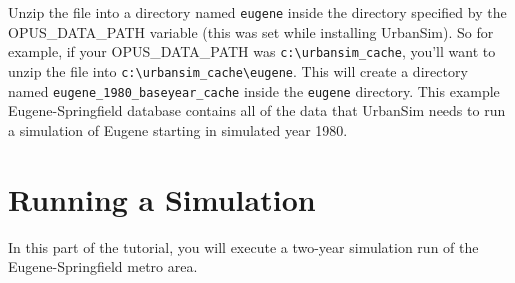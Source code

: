 \documentclass{howto}
\begin{document}

Unzip the file into a directory named \verb|eugene| inside the directory specified by the
OPUS_DATA_PATH variable (this was set while installing UrbanSim).  So for 
example, if your OPUS_DATA_PATH was \verb|c:\urbansim_cache|,
you'll want to unzip the file into \verb|c:\urbansim_cache\eugene|.  This will create a directory
named \verb|eugene_1980_baseyear_cache| inside the \verb|eugene| directory. This example 
Eugene-Springfield database contains all of the data that UrbanSim needs to 
run a simulation of Eugene starting in simulated year 1980.

\section*{Running a Simulation}

In this part of the tutorial, you will execute a two-year simulation run of the
Eugene-Springfield metro area.
\end{document}
